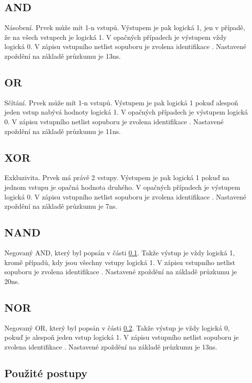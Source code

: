 \documentclass[11pt,a4paper]{article}
\begin{document}
			\subsection{AND}
				\label{and}
				Násobení. Prvek může mít 1-n vstupů. Výstupem je pak logická 1, jen v případě, že na všech vstupech je logická 1. V opačných případech je výstupem vždy logická 0. V zápisu vstupního netlist sopuboru je zvolena identifikace .  Nastavené zpoždění na základě průzkumu je 13ns\cite{andSheet}.

			\subsection{OR}
				\label{or}
				Sčítání. Prvek může mít 1-n vstupů. Výstupem je pak logická 1 pokuď alespoň jeden vstup nabývá hodnoty logická 1. V opačných případech je výstupem logická 0. V zápisu vstupního netlist sopuboru je zvolena identifikace .  Nastavené zpoždění na základě průzkumu je 11ns\cite{orSheet}.

			\subsection{XOR}
				Exkluzivita. Prvek má právě 2 vstupy. Výstupem je pak logická 1 pokuď na jednom vstupu je opačná hodnota druhého. V opačných případech je výstupem logická 0. V zápisu vstupního netlist sopuboru je zvolena identifikace .  Nastavené zpoždění na základě průzkumu je 7ns\cite{xorSheet}.

			\subsection{NAND}
				Negovaný AND, který byl popsán v části \ref{and}. Takže výstup je vždy logická 1, kromě případů, kdy jsou všechny vstupy logická 1. V zápisu vstupního netlist sopuboru je zvolena identifikace . Nastavené zpoždění na základě průzkumu je 20ns\cite{nandSheet}.

			\subsection{NOR}
				Negovaný OR, který byl popsán v části \ref{or}. Takže výstup je vždy logická 0, pokuď je alespoň jeden vstup logická 1. V zápisu vstupního netlist sopuboru je zvolena identifikace .  Nastavené zpoždění na základě průzkumu je 13ns\cite{norSheet}.


		\subsection{Použité postupy}
\end{document}
